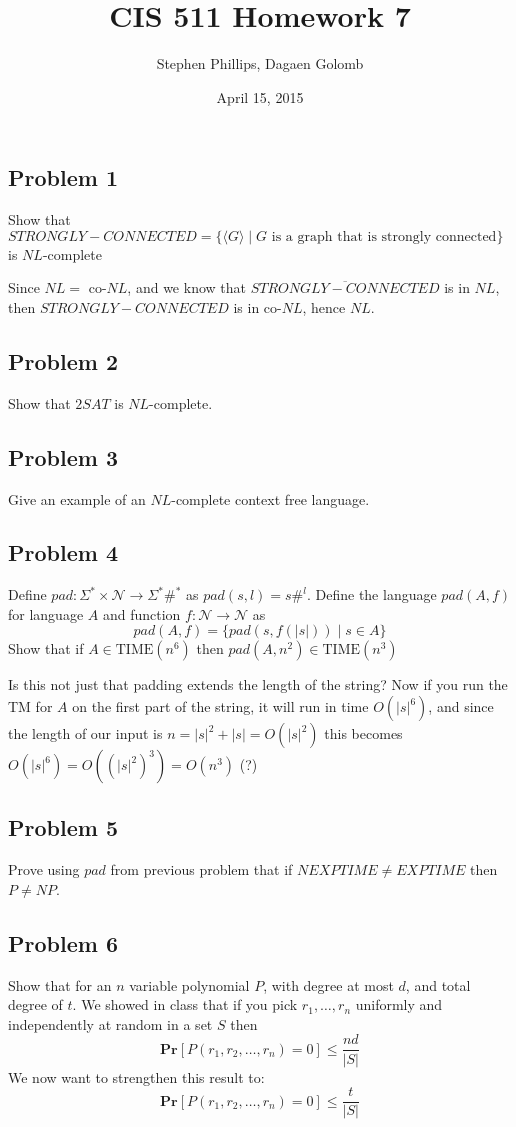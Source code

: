 \documentclass[english]{article}
\title{CIS 511 Homework 7}
\author{Stephen Phillips, Dagaen Golomb}
\date{April 15, 2015}
\begin{document}
\maketitle
\subsection*{Problem 1}
Show that $STRONGLY-CONNECTED = \{ \langle G \rangle \mid G \textrm{ is a graph that is strongly connected} \}$
is $NL$-complete

Since $NL = $ co-$NL$, and we know that $\overline{STRONGLY-CONNECTED}$ is in $NL$, then $STRONGLY-CONNECTED$ is in
co-$NL$, hence $NL$. 

\subsection*{Problem 2}
Show that $2SAT$ is $NL$-complete.

\subsection*{Problem 3}
Give an example of an $NL$-complete context free language.

\subsection*{Problem 4}
Define $pad : \Sigma^* \times \mathcal{N} \rightarrow \Sigma^*\#^*$ as $pad(s,l) = s\#^l$. Define
the language $pad(A,f)$ for language $A$ and function $f : \mathcal{N} \rightarrow \mathcal{N}$ as
\[ pad(A,f) = \{ pad(s,f(|s|)) \mid s \in A \} \]
Show that if $A \in \textrm{TIME}(n^6)$ then $pad(A,n^2) \in \textrm{TIME}(n^3)$

Is this not just that padding extends the length of the string? Now if you run the TM for $A$ on the 
first part of the string, it will run in time $O(|s|^6)$, and since the length of our input is
$n = |s|^2 + |s| = O(|s|^2)$ this becomes $O(|s|^6) = O((|s|^2)^3) = O(n^3)$ (?)

\subsection*{Problem 5}
Prove using $pad$ from previous problem that if $NEXPTIME \neq EXPTIME$ then $P \neq NP$. 

\subsection*{Problem 6}
Show that for an $n$ variable polynomial $P$, with degree at most $d$, and total degree of $t$. We showed in class
that if you pick $r_1, \ldots, r_n$ uniformly and independently at random in a set $S$ then 
\[ \mathbf{Pr}[P(r_1,r_2,\ldots,r_n) = 0] \le \frac{nd}{|S|} \]
We now want to strengthen this result to:
\[ \mathbf{Pr}[P(r_1,r_2,\ldots,r_n) = 0] \le \frac{t}{|S|} \]
\end{document}
